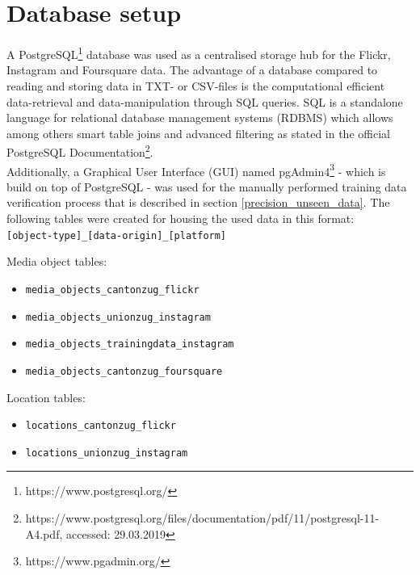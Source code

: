 \section{Database setup} \label{database_setup}
A PostgreSQL\footnote{https://www.postgresql.org/} database was used as a centralised storage hub for the Flickr, Instagram and Foursquare data. The advantage of a database compared to reading and storing data in TXT- or CSV-files is the computational efficient data-retrieval and data-manipulation through SQL queries. SQL is a standalone language for relational database management systems (RDBMS) which allows among others smart table joins and advanced filtering as stated in the official PostgreSQL Documentation\footnote{https://www.postgresql.org/files/documentation/pdf/11/postgresql-11-A4.pdf, accessed: 29.03.2019}.\\
Additionally, a Graphical User Interface (GUI) named pgAdmin4\footnote{https://www.pgadmin.org/} - which is build on top of PostgreSQL - was used for the manually performed training data verification process that is described in section \ref{precision_unseen_data}. The following tables were created for housing the used data in this format:\\ \texttt{[object-type]\_[data-origin]\_[platform]} \\
\newline

Media object tables:

\begin{itemize}
    \item \texttt{media\_objects\_cantonzug\_flickr}
    \item \texttt{media\_objects\_unionzug\_instagram}
    \item \texttt{media\_objects\_trainingdata\_instagram}
    \item \texttt{media\_objects\_cantonzug\_foursquare}
\end{itemize}

Location tables:

\begin{itemize}
    \item \texttt{locations\_cantonzug\_flickr}
    \item \texttt{locations\_unionzug\_instagram}
\end{itemize}

